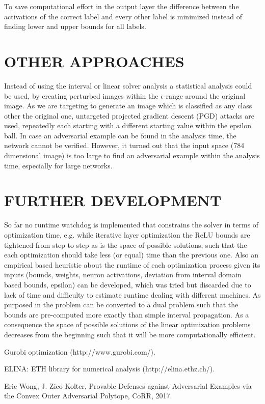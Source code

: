 \documentclass[letterpaper, 10 pt, conference]{ieeeconf}
\begin{document}
\newline
To save computational effort in the output layer the difference between the activations of the correct label and every other label is minimized instead of finding lower and upper bounds for all labels.

\section{OTHER APPROACHES}
Instead of using the interval or linear solver analysis a statistical analysis could be used, by creating perturbed images within the $\epsilon$-range around the original image. As we are targeting to generate an image which is classified as any class other the original one, untargeted projected gradient descent (PGD) attacks are used, repeatedly each starting with a different starting value within the epsilon ball.  In case an adversarial example can be found in the analysis time, the network cannot be verified. However, it turned out that the input space (784 dimensional image) is too large to find an adversarial example within the analysis time, especially for large networks. 

\section{FURTHER DEVELOPMENT}
So far no runtime watchdog is implemented that constrains the solver in terms of optimization time, e.g. while iterative layer optimization the ReLU bounds are tightened from step to step as is the space of possible solutions, such that the each optimization should take less (or equal) time than the previous one. Also an empirical based heuristic about the runtime of each optimization process given its inputs (bounds, weights, neuron activations, deviation from interval domain based bounds, epsilon) can be developed, which was tried but discarded due to lack of time and difficulty to estimate runtime dealing with different machines. 
\newline
As purposed in \cite{c3} the problem can be converted to a dual problem such that the bounds are pre-computed more exactly than simple interval propagation. As a consequence the space of possible solutions of the linear optimization problems decreases from the beginning  such that it will be more computationally efficient. 

\begin{thebibliography}{99}

 Gurobi optimization (http://www.gurobi.com/).

 ELINA: ETH library for numerical analysis (http://elina.ethz.ch/). 

 Eric Wong, J. Zico Kolter, Provable Defenses against Adversarial Examples via the Convex Outer Adversarial Polytope, CoRR, 2017.

\end{thebibliography}
\end{document}
